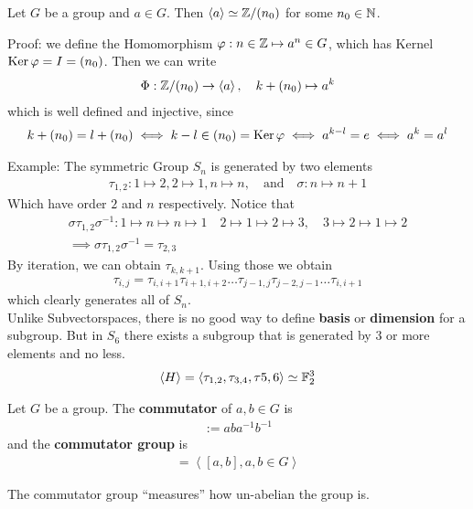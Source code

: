 \begin{lemma}[]
	Let $G$ be a group and $a \in G$. Then $\left<a\right> \simeq \mathbb{Z}/(n_0)$ for some $n_0 \in \mathbb{N}$.
\end{lemma}
Proof: we define the Homomorphism $\varphi: n \in \mathbb{Z} \mapsto a^{n} \in G$, which has Kernel $\operatorname{Ker} \varphi = I = (n_0)$. Then we can write
\begin{align*}
	\Phi: \mathbb{Z}/(n_0) \to \left<a\right>, \quad k + (n_0) \mapsto a^k
\end{align*}
which is well defined and injective, since
\begin{align*}
	k + (n_0) = l + (n_0) \iff k -l \in (n_0)= \operatorname{Ker} \varphi \iff a^{k-l} = e \iff a^k = a^{l}
\end{align*}


Example: The symmetric Group $S_n$ is generated by two elements
\begin{align*}
	\tau_{1,2}: 1 \mapsto 2, 2 \mapsto 1, n \mapsto n, \quad \text{and} \quad \sigma: n \mapsto n+1
\end{align*}
Which have order $2$ and $n$ respectively. Notice that
\begin{align*}
	\sigma \tau_{1,2} \sigma^{-1}: 1 \mapsto n \mapsto n \mapsto 1 \quad 2 \mapsto 1 \mapsto 2 \mapsto 3, \quad 3 \mapsto 2 \mapsto 1 \mapsto 2\\
\implies \sigma \tau_{1,2} \sigma^{-1} = \tau_{2,3}
\end{align*}
By iteration, we can obtain $\tau_{k,k+1}$. Using those we obtain
\begin{align*}
\tau_{i,j} = \tau_{i,i+1} \tau_{i+1,i+2} \ldots \tau_{j-1,j} \tau_{j-2,j-1} \ldots \tau_{i,i+1}
\end{align*}
which clearly generates all of $S_n$.\\

Unlike Subvectorspaces, there is no good way to define \textbf{basis} or \textbf{dimension} for a subgroup. But in $S_6$ there exists a subgroup that is generated by $3$ or more elements and no less.
\begin{align*}
	\left<H\right> = \left<\tau_{1,2}, \tau_{3,4}, \tau{5,6}\right> \simeq \mathbb{F}_2^3
\end{align*}

\begin{definition}[]
	Let $G$ be a group. The \textbf{commutator} of $a,b \in G$ is
	\begin{align*}
		[a,b] := aba^{-1}b^{-1}
	\end{align*}
	and the \textbf{commutator group} is 
	\begin{align*}
		[G,G] = \left<[a,b], a,b \in G\right>
	\end{align*}
\end{definition}
The commutator group ``measures'' how un-abelian the group is.
